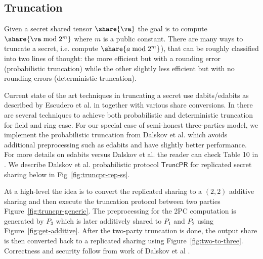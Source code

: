\subsection{Truncation}
\label{subsec:truncation}

Given a secret shared tensor $\share{\va}$ the goal is to compute $\share{\va \bmod 2^m}$
where $m$ is a public constant. There are many ways to truncate a secret, i.e. compute $\share{a \bmod 2^m}$), that
can be roughly classified into two lines of thought: the more efficient but with a rounding
error (probabilistic
truncation) while the other slightly less efficient but with no rounding errors (deterministic
truncation).

Current state of the art techniques in truncating a secret use
dabits/edabits as described by Escudero et al. in \cite{C:EGKRS20} together with
various share conversions. In \cite{C:EGKRS20} there are several techniques
to achieve both probabilistic and deterministic truncation for field and ring
case. For our special case of semi-honest three-parties model, 
we implement the probabilistic truncation from Dalskov et al. \cite{PoPETS:DalEscKel20} 
which avoids additional preprocessing such as edabits and have slightly better performance.
For more details on edabits versus Dalskov et al. the reader can check Table 10 in \cite{C:EGKRS20}.
We describe Dalskov et al. probabilistic protocol $\mathsf{TruncPR}$ for replicated secret
sharing below in Fig~\ref{fig:truncpr-rep-ss}. 

At a high-level the idea is to convert the replicated sharing to a $(2,2)$ additive sharing
and then execute the truncation protocol between two parties Figure~\ref{fig:truncpr-generic}. 
The preprocessing for the 2PC computation is 
generated by $P_3$ which is later additively shared to $P_1$ and $P_2$ using Figure~\ref{fig:get-additive}. After the two-party truncation is done, the output share is then converted
back to a replicated sharing using Figure~\ref{fig:two-to-three}. Correctness and security follow from work of Dalskov et al \cite{PoPETS:DalEscKel20}.


